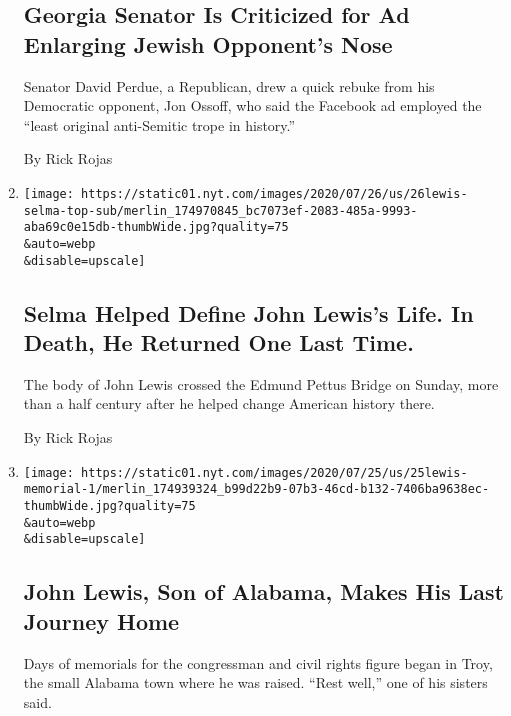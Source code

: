 \begin{enumerate}
{  \subsection{Georgia Senator Is Criticized for Ad Enlarging Jewish
  Opponent's
  Nose}\label{georgia-senator-is-criticized-for-ad-enlarging-jewish-opponents-nose}}

  Senator David Perdue, a Republican, drew a quick rebuke from his
  Democratic opponent, Jon Ossoff, who said the Facebook ad employed the
  ``least original anti-Semitic trope in history.''

  By Rick Rojas
\item
  \href{/2020/07/26/us/selma-john-lewis-memorial.html}{}

  \texttt{[image: https://static01.nyt.com/images/2020/07/26/us/26lewis-selma-top-sub/merlin\_174970845\_bc7073ef-2083-485a-9993-aba69c0e15db-thumbWide.jpg?quality=75\\\&auto=webp\\\&disable=upscale]}

  \hypertarget{selma-helped-define-john-lewiss-life-in-death-he-returned-one-last-time}{%
  \subsection{Selma Helped Define John Lewis's Life. In Death, He
  Returned One Last
  Time.}\label{selma-helped-define-john-lewiss-life-in-death-he-returned-one-last-time}}

  The body of John Lewis crossed the Edmund Pettus Bridge on Sunday,
  more than a half century after he helped change American history
  there.

  By Rick Rojas
\item
  \href{/2020/07/25/us/john-lewis-memorial-service.html}{}

  \texttt{[image: https://static01.nyt.com/images/2020/07/25/us/25lewis-memorial-1/merlin\_174939324\_b99d22b9-07b3-46cd-b132-7406ba9638ec-thumbWide.jpg?quality=75\\\&auto=webp\\\&disable=upscale]}

  \hypertarget{john-lewis-son-of-alabama-makes-his-last-journey-home}{%
  \subsection{John Lewis, Son of Alabama, Makes His Last Journey
  Home}\label{john-lewis-son-of-alabama-makes-his-last-journey-home}}

  Days of memorials for the congressman and civil rights figure began in
  Troy, the small Alabama town where he was raised. ``Rest well,'' one
  of his sisters said.


\end{enumerate}
